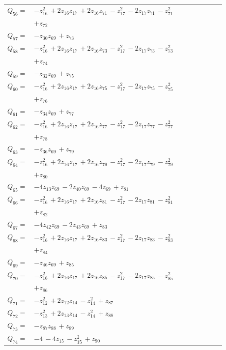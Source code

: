 \begin{longtable}{@{}r p{0.88\linewidth}@{}}
$Q_{56}=$ & $-z_{16}^{2}\,+2z_{16}z_{17}\,+2z_{16}z_{71}\,-z_{17}^{2}\,-2z_{17}z_{71}\,-z_{71}^{2}$\\
 & $+z_{72}$\\[5pt]
$Q_{57}=$ & $-z_{30}z_{69}\,+z_{73}$\\[5pt]
$Q_{58}=$ & $-z_{16}^{2}\,+2z_{16}z_{17}\,+2z_{16}z_{73}\,-z_{17}^{2}\,-2z_{17}z_{73}\,-z_{73}^{2}$\\
 & $+z_{74}$\\[5pt]
$Q_{59}=$ & $-z_{32}z_{69}\,+z_{75}$\\[5pt]
$Q_{60}=$ & $-z_{16}^{2}\,+2z_{16}z_{17}\,+2z_{16}z_{75}\,-z_{17}^{2}\,-2z_{17}z_{75}\,-z_{75}^{2}$\\
 & $+z_{76}$\\[5pt]
$Q_{61}=$ & $-z_{34}z_{69}\,+z_{77}$\\[5pt]
$Q_{62}=$ & $-z_{16}^{2}\,+2z_{16}z_{17}\,+2z_{16}z_{77}\,-z_{17}^{2}\,-2z_{17}z_{77}\,-z_{77}^{2}$\\
 & $+z_{78}$\\[5pt]
$Q_{63}=$ & $-z_{36}z_{69}\,+z_{79}$\\[5pt]
$Q_{64}=$ & $-z_{16}^{2}\,+2z_{16}z_{17}\,+2z_{16}z_{79}\,-z_{17}^{2}\,-2z_{17}z_{79}\,-z_{79}^{2}$\\
 & $+z_{80}$\\[5pt]
$Q_{65}=$ & $-4z_{13}z_{69}\,-2z_{40}z_{69}\,-4z_{69}\,+z_{81}$\\[5pt]
$Q_{66}=$ & $-z_{16}^{2}\,+2z_{16}z_{17}\,+2z_{16}z_{81}\,-z_{17}^{2}\,-2z_{17}z_{81}\,-z_{81}^{2}$\\
 & $+z_{82}$\\[5pt]
$Q_{67}=$ & $-4z_{42}z_{69}\,-2z_{43}z_{69}\,+z_{83}$\\[5pt]
$Q_{68}=$ & $-z_{16}^{2}\,+2z_{16}z_{17}\,+2z_{16}z_{83}\,-z_{17}^{2}\,-2z_{17}z_{83}\,-z_{83}^{2}$\\
 & $+z_{84}$\\[5pt]
$Q_{69}=$ & $-z_{46}z_{69}\,+z_{85}$\\[5pt]
$Q_{70}=$ & $-z_{16}^{2}\,+2z_{16}z_{17}\,+2z_{16}z_{85}\,-z_{17}^{2}\,-2z_{17}z_{85}\,-z_{85}^{2}$\\
 & $+z_{86}$\\[5pt]
$Q_{71}=$ & $-z_{12}^{2}\,+2z_{12}z_{14}\,-z_{14}^{2}\,+z_{87}$\\[5pt]
$Q_{72}=$ & $-z_{13}^{2}\,+2z_{13}z_{14}\,-z_{14}^{2}\,+z_{88}$\\[5pt]
$Q_{73}=$ & $-z_{87}z_{88}\,+z_{89}$\\[5pt]
$Q_{74}=$ & $-4\,-4z_{15}\,-z_{15}^{2}\,+z_{90}$\\[5pt]

\end{longtable}
